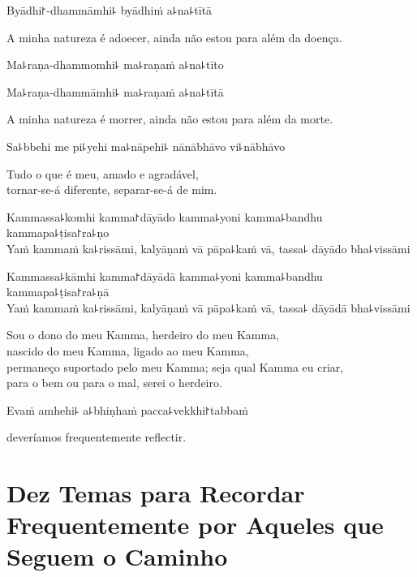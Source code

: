 %
Byādhi꜓-dhammāmhi꜕ byādhiṁ a꜕na꜕tītā

\begin{english}
  A minha natureza é adoecer, ainda não estou para além da doença.
\end{english}

%
Ma꜕raṇa-dhammomhi꜕ ma꜕raṇaṁ a꜕na꜕tīto

%
Ma꜕raṇa-dhammāmhi꜕ ma꜕raṇaṁ a꜕na꜕tītā

\begin{english}
  A minha natureza é morrer, ainda não estou para além da morte.
\end{english}

Sa꜕bbehi me pi꜕yehi ma꜕nāpehi꜕ nānābhāvo vi꜕nābhāvo

\begin{english}
  Tudo o que é meu, amado e agradável,\\
  tornar-se-á diferente, separar-se-á de mim.
\end{english}

%
Kammassa꜕komhi kamma꜓dāyādo kamma꜕yoni kamma꜕bandhu kammapa꜕ṭisa꜓ra꜕ṇo\\
Yaṁ kammaṁ ka꜕rissāmi, kalyāṇaṁ vā pāpa꜕kaṁ vā, tassa꜕ dāyādo bha꜕vissāmi

\clearpage

%
Kammassa꜕kāmhi kamma꜓dāyādā kamma꜕yoni kamma꜕bandhu kammapa꜕ṭisa꜓ra꜕ṇā\\
Yaṁ kammaṁ ka꜕rissāmi, kalyāṇaṁ vā pāpa꜕kaṁ vā, tassa꜕ dāyādā bha꜕vissāmi

\begin{english}
  Sou o dono do meu Kamma, herdeiro do meu Kamma,\\
  nascido do meu Kamma, ligado ao meu Kamma,\\
  permaneço suportado pelo meu Kamma; seja qual Kamma eu criar,\\
  para o bem ou para o mal,  serei o herdeiro.
\end{english}

Evaṁ amhehi꜕ a꜕bhiṇhaṁ pacca꜕vekkhi꜓tabbaṁ

\begin{english}
   deveríamos frequentemente reflectir.
\end{english}

\chapter[Dez Temas]{Dez Temas para Recordar Frequentemente por Aqueles que Seguem o Caminho}

